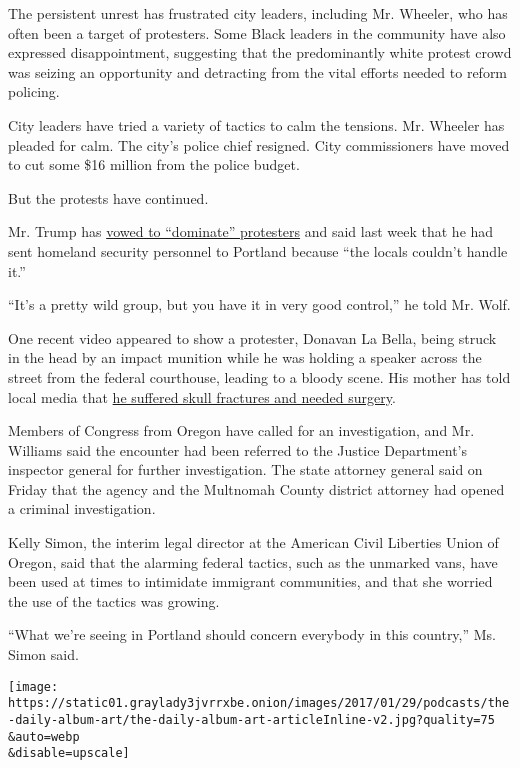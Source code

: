 The persistent unrest has frustrated city leaders, including Mr.
Wheeler, who has often been a target of protesters. Some Black leaders
in the community have also expressed disappointment, suggesting that the
predominantly white protest crowd was seizing an opportunity and
detracting from the vital efforts needed to reform policing.

City leaders have tried a variety of tactics to calm the tensions. Mr.
Wheeler has pleaded for calm. The city's police chief resigned. City
commissioners have moved to cut some \$16 million from the police
budget.

But the protests have continued.

Mr. Trump has
\href{https://www.nytimes3xbfgragh.onion/2020/06/02/us/politics/trump-law-enforcement-protests.html}{vowed
to ``dominate'' protesters} and said last week that he had sent homeland
security personnel to Portland because ``the locals couldn't handle
it.''

``It's a pretty wild group, but you have it in very good control,'' he
told Mr. Wolf.

One recent video appeared to show a protester, Donavan La Bella, being
struck in the head by an impact munition while he was holding a speaker
across the street from the federal courthouse, leading to a bloody
scene. His mother has told local media that
\href{https://www.oregonlive.com/news/2020/07/police-shoot-portland-protester-in-head-with-impact-weapon-causing-severe-injuries.html}{he
suffered skull fractures and needed surgery}.

Members of Congress from Oregon have called for an investigation, and
Mr. Williams said the encounter had been referred to the Justice
Department's inspector general for further investigation. The state
attorney general said on Friday that the agency and the Multnomah County
district attorney had opened a criminal investigation.

Kelly Simon, the interim legal director at the American Civil Liberties
Union of Oregon, said that the alarming federal tactics, such as the
unmarked vans, have been used at times to intimidate immigrant
communities, and that she worried the use of the tactics was growing.

``What we're seeing in Portland should concern everybody in this
country,'' Ms. Simon said.

\texttt{[image: https://static01.graylady3jvrrxbe.onion/images/2017/01/29/podcasts/the-daily-album-art/the-daily-album-art-articleInline-v2.jpg?quality=75\\\&auto=webp\\\&disable=upscale]}

